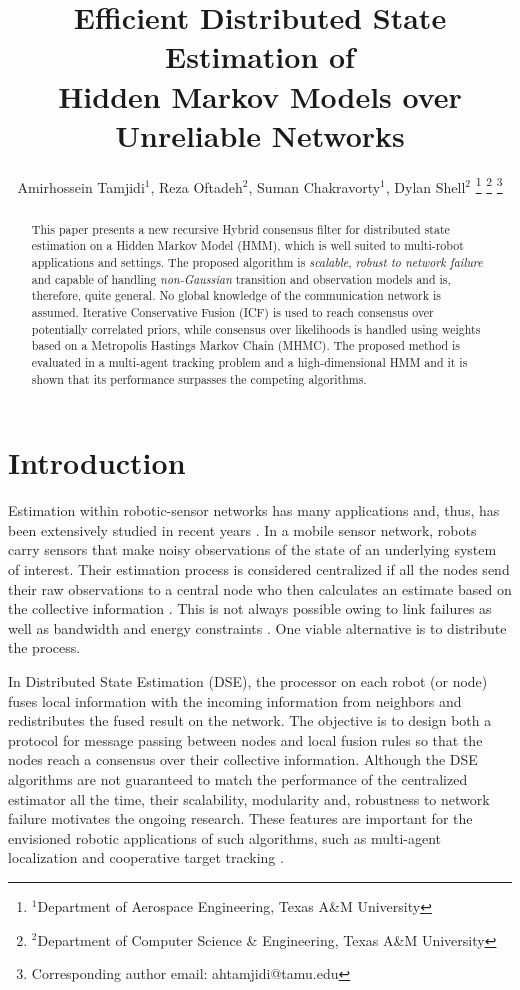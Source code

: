 \documentclass[conference]{IEEEtran}
\title{\LARGE \bf Efficient Distributed State Estimation of\\ Hidden Markov Models over Unreliable
	Networks}
\author {Amirhossein Tamjidi$^{1}$, Reza Oftadeh$^{2}$, Suman Chakravorty$^{1}$, Dylan Shell$^{2}$
\thanks{$^{1}$Department of Aerospace Engineering, Texas A\&M University}
\thanks{$^{2}$Department of Computer Science \& Engineering, Texas A\&M University}
\thanks{Corresponding author email: ahtamjidi@tamu.edu}}
\theoremstyle{remark}
\begin{document}
	
	\maketitle
\begin{abstract}
This paper presents a new recursive Hybrid consensus filter for 
distributed state estimation on a Hidden Markov Model (HMM), which is 
well suited to multi-robot applications and settings. The proposed algorithm is 
\textit{scalable}, \textit{robust to network failure} and capable of handling 
\textit{non-Gaussian} transition and observation models and is, therefore, 
quite general. No global knowledge of the communication network is assumed. Iterative 
Conservative Fusion (ICF) is used to reach consensus over potentially 
correlated priors, while consensus over likelihoods is handled using weights 
based on a Metropolis Hastings Markov Chain (MHMC). The proposed method is 
evaluated in a multi-agent tracking problem and a high-dimensional HMM and it 
is shown that  its performance surpasses the competing algorithms. 
\end{abstract}

\section{Introduction}
Estimation within robotic-sensor networks has many applications and, thus, has been 
extensively studied in recent years 
\cite{durrant2001data,campbell2016distributed,boem2015decentralized}. In a 
 mobile sensor network, robots carry sensors that make noisy observations of the 
state of an underlying system of interest. Their estimation process is considered 
centralized if all the nodes send their raw observations to a central node who 
then calculates an estimate based on the collective information 
\cite{ahmed201522}. This is not always possible owing to link failures as well as 
bandwidth and energy constraints \cite{Zhang_ttradeof1}. One viable alternative 
is to distribute the process.

In Distributed State Estimation (DSE), the processor on each robot (or node)
fuses local information with the incoming information from neighbors and
redistributes the fused result on the network. The objective is to design both
a protocol for message passing between nodes and local fusion rules so that the
nodes reach a consensus over their collective information. Although the DSE
algorithms are not guaranteed to match the performance of the centralized
estimator all the time, their scalability, modularity and, robustness to
network failure motivates the ongoing research. These features are important
for the envisioned robotic applications of such algorithms, such as multi-agent
localization \cite{5509143} and cooperative target tracking
\cite{whitacre2013cooperative}. 
\end{document}
